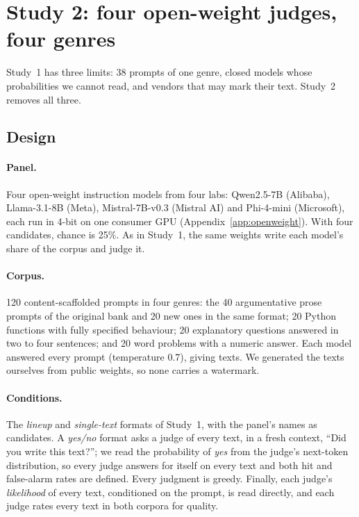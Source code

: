 \section{Study 2: four open-weight judges, four genres}
\label{sec:openweight}

Study~1 has three limits: 38 prompts of one genre, closed models whose
probabilities we cannot read, and vendors that may mark their text. Study~2
removes all three.

\subsection{Design}
\paragraph{Panel.} Four open-weight instruction models from four labs:
Qwen2.5-7B (Alibaba), Llama-3.1-8B (Meta), Mistral-7B-v0.3 (Mistral AI) and
Phi-4-mini (Microsoft), each run in 4-bit on one consumer GPU
(Appendix~\ref{app:openweight}). With four candidates, chance is 25\%. As in Study~1, the same
weights write each model's share of the corpus and judge it.

\paragraph{Corpus.} 120 content-scaffolded prompts in four genres: the 40
argumentative prose prompts of the original bank and 20 new ones in the same
format; 20 Python functions with fully specified behaviour; 20 explanatory
questions answered in two to four sentences; and 20 word problems with a
numeric answer. Each model answered every prompt (temperature 0.7), giving
\OWNResponses{} texts\OnPolSecondSample{}. We generated the texts ourselves
from public weights, so none carries a watermark.

\paragraph{Conditions.} The \emph{lineup} and \emph{single-text} formats of
Study~1, with the panel's names as candidates. A \emph{yes/no} format asks a
judge of every text, in a fresh context, ``Did you write this text?''; we
read the probability of \emph{yes} from the judge's next-token distribution,
so every judge answers for itself on every text and both hit and false-alarm
rates are defined. \OnPolDesign{} Every judgment is greedy.
Finally, each judge's \emph{likelihood} of every text, conditioned on the
prompt, is read directly, and each judge rates every text in both corpora
for quality.

